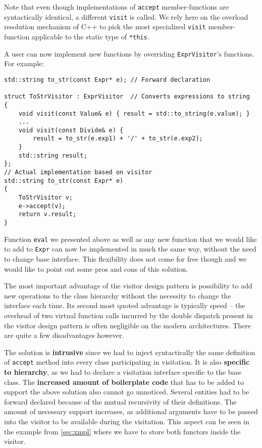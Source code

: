 \documentclass[preprint]{sigplanconf}
\makeatletter
\DeclareRobustCommand{\code}[1]{{\lstinline[breaklines=false,escapechar=@]{#1}}}
\makeatother
\begin{document}
Note that even though implementations of \code{accept} member-functions are 
syntactically identical, a different \code{visit} is called. We rely here on the 
overload resolution mechanism of C++ to pick the most specialized \code{visit} 
member-function applicable to the static type of \code{*this}. 


A user can now implement new functions by overriding \code{ExprVisitor}'s 
functions. For example:

\begin{lstlisting}
std::string to_str(const Expr* e); // Forward declaration

struct ToStrVisitor : ExprVisitor  // Converts expressions to string
{
    void visit(const Value& e) { result = std::to_string(e.value); }
    ...
    void visit(const Divide& e) { 
        result = to_str(e.exp1) + '/' + to_str(e.exp2); 
    }
    std::string result;
};
// Actual implementation based on visitor
std::string to_str(const Expr* e)
{
    ToStrVisitor v;
    e->accept(v);
    return v.result;
}
\end{lstlisting}

Function \code{eval} we presented above as well as any new function that we 
would like to add to \code{Expr} can now be implemented in much the same way, 
without the need to change base interface. This flexibility does not come for 
free though and we would like to point out some pros and cons of this solution.

The most important advantage of the visitor design pattern is possibility to add 
new operations to the class hierarchy without the necessity to change the 
interface each time. Its second most quoted advantage is typically speed -- the 
overhead of two virtual function calls incurred by the double dispatch present 
in the visitor design pattern is often negligible on the modern architectures. 
There are quite a few disadvantages however.

The solution is {\bf intrusive} since we had to inject syntactically the same 
definition of \code{accept} method into every class participating in visitation. 
It is also {\bf specific to hierarchy}, as we had to declare a visitation 
interface specific to the base class. The {\bf increased amount of boilerplate 
code} that has to be added to support the above solution also cannot go unnoticed. 
Several entities had to be forward declared because of the mutual recursivity of 
their definitions. The amount of necessary support increases, as additional 
arguments have to be passed into the visitor to be available during the 
visitation. This aspect can be seen in the example from \textsection\ref{sec:xmpl} 
where we have to store both functors inside the visitor.
\end{document}
